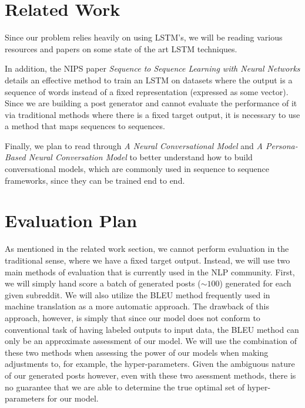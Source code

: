 \documentclass[11pt]{article}
\begin{document}
\section*{Related Work}
Since our problem relies heavily on using LSTM's, we will be reading various resources and papers on some state of the art LSTM techniques. 

In addition, the NIPS paper \textit{Sequence to Sequence Learning with Neural Networks} \cite{sutskever2014sequence} details an effective method to train an LSTM on datasets where the output is a sequence of words instead of a fixed representation (expressed as some vector). Since we are building a post generator and cannot evaluate the performance of it via traditional methods where there is a fixed target output, it is necessary to use a method that maps sequences to sequences.  

Finally, we plan to read through \textit{A Neural Conversational Model} \cite{vinyals2015neural} and \textit{A Persona-Based Neural Conversation Model} \cite{li2016persona} to better understand how to build conversational models, which are commonly used in sequence to sequence frameworks, since they can be trained end to end.

\section*{Evaluation Plan}
As mentioned in the related work section, we cannot perform evaluation in the traditional sense, where we have a fixed target output. Instead, we will use two main methods of evaluation that is currently used in the NLP community. First, we will simply hand score a batch of generated posts ($\sim 100$) generated for each given subreddit. We will also utilize the BLEU method \cite{papineni2002bleu} frequently used in machine translation as a more automatic approach. The drawback of this approach, however, is simply that since our model does not conform to conventional task of having labeled outputs to input data, the BLEU method can only be an approximate assessment of our model. We will use the combination of these two methods when assessing the power of our models when making adjustments to, for example, the hyper-parameters. Given the ambiguous nature of our generated posts however, even with these two asessment methods, there is no guarantee that we are able to determine the true optimal set of hyper-parameters for our model. 


\printbibliography
\end{document}

